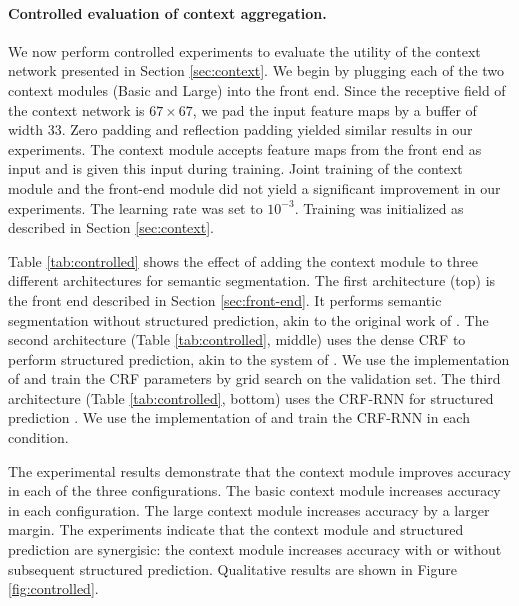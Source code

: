 \documentclass{article} %
\newcommand{\timess}{\mathbin{\!\times\!}}
\begin{document}
\paragraph{Controlled evaluation of context aggregation.}
We now perform controlled experiments to evaluate the utility of the context network presented in Section \ref{sec:context}. We begin by plugging each of the two context modules (Basic and Large) into the front end. Since the receptive field of the context network is $67\timess 67$, we pad the input feature maps by a buffer of width 33. Zero padding and reflection padding yielded similar results in our experiments. The context module accepts feature maps from the front end as input and is given this input during training.
Joint training of the context module and the front-end module did not yield a significant improvement in our experiments. The learning rate was set to $10^{-3}$. Training was initialized as described in Section \ref{sec:context}.

Table \ref{tab:controlled} shows the effect of adding the context module to three different architectures for semantic segmentation. The first architecture (top) is the front end described in Section \ref{sec:front-end}. It performs semantic segmentation without structured prediction, akin to the original work of \cite{Long2015}. The second architecture (Table \ref{tab:controlled}, middle) uses the dense CRF to perform structured prediction, akin to the system of \cite{Chen2015ICLR}. We use the implementation of \cite{KrahenbuhlKoltun2011} and train the CRF parameters by grid search on the validation set. The third architecture (Table \ref{tab:controlled}, bottom) uses the CRF-RNN for structured prediction \citep{Zheng2015}. We use the implementation of \cite{Zheng2015} and train the CRF-RNN in each condition.

The experimental results demonstrate that the context module improves accuracy in each of the three configurations. The basic context module increases accuracy in each configuration. The large context module increases accuracy by a larger margin. The experiments indicate that the context module and structured prediction are synergisic: the context module increases accuracy with or without subsequent structured prediction. Qualitative results are shown in Figure \ref{fig:controlled}.
\end{document}
